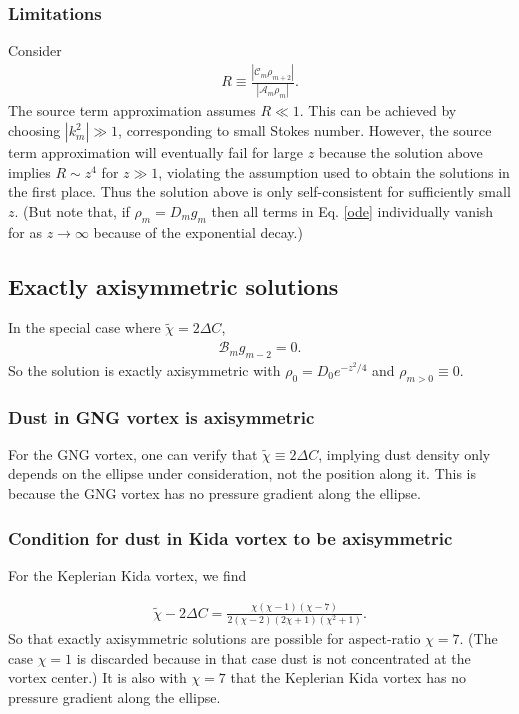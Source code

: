 \documentclass[12pt]{article} %
\begin{document}
\subsubsection{Limitations}
Consider
\begin{align}
R\equiv\frac{|\mathcal{C}_m\rho_{m+2}|}{|\mathcal{A}_m\rho_m|}.
\end{align}
The source term approximation assumes $R\ll 1$. This can be achieved by choosing $|k_m^2|\gg1$, corresponding to small Stokes number. However, the source term approximation will eventually fail for large $z$ because the solution above implies $R\sim z^4$ for $z\gg1$, violating the assumption used to obtain the solutions in the first place. Thus the solution above is only self-consistent for sufficiently small $z$.  (But note that, if $\rho_m = D_m g_m$ then all terms in Eq. \ref{ode} individually vanish for as $z\to\infty$ because of the exponential decay.)


\subsection{Exactly axisymmetric solutions}
In the special case where $\tilde{\chi} = 2\Delta C$,
\begin{align}
\mathcal{B}_mg_{m-2} = 0.
\end{align}
So the solution is exactly axisymmetric with $\rho_0 = D_0e^{-z^2/4}$ and $\rho_{m>0} \equiv 0$. 

\subsubsection{Dust in GNG vortex is axisymmetric}
For the GNG vortex, one can verify that $\tilde{\chi}\equiv 2\Delta C$, implying dust density only depends on the ellipse under consideration, not the position along it. This is because the GNG vortex has no pressure gradient along the ellipse. 

\subsubsection{Condition for dust in Kida vortex to be axisymmetric}
For the Keplerian Kida vortex, we find

\begin{align}
\tilde{\chi} - 2\Delta C = \frac{\chi(\chi-1)(\chi-7)}{2(\chi-2)(2\chi+1)(\chi^2+1)}.
\end{align}
So that exactly axisymmetric solutions are possible for aspect-ratio $\chi=7$. (The case $\chi=1$ is discarded because in that case dust is not concentrated at the vortex center.) It is also with $\chi=7$ that the Keplerian Kida vortex has no pressure gradient along the ellipse. 
\end{document}
